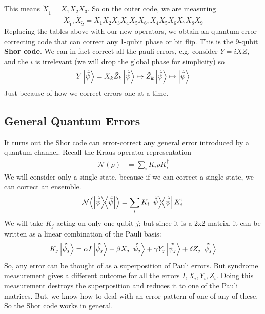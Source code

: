 This means $\tilde{X}_{\tilde{1}} = X_1 X_2 X_3$.
So on the outer code, we are measuring
\[ \tilde{X}_{\tilde{1}}, \tilde{X}_{\tilde{2}} = X_1 X_2 X_3 X_4 X_5 X_6, X_4 X_5 X_6 X_7 X_8 X_9 \]
Replacing the tables above with our new operators, we obtain an quantum error correcting code that
can correct any 1-qubit phase or bit flip. This is the $9$-qubit \textbf{Shor code}. 
We can in fact correct
all the pauli errors, e.g. consider $Y = i XZ$, and the $i$ is irrelevant (we will drop the global phase for simplicity) so \[ Y \ket{\tilde{\tilde{\psi}}} = X_k \tilde{Z}_k \ket{\tilde{\tilde{\psi}}} \mapsto \tilde{Z}_k \ket{\tilde{\tilde{\psi}}} \mapsto \ket{\tilde{\tilde{\psi}}}\]
Just because of how we correct errors one at a time.

\subsection{General Quantum Errors}
It turns out the Shor code can error-correct any general error introduced by a quantum channel.
Recall the Kraus operator representation
\begin{align*}
    \mathcal{N}(\rho) &= \sum_i K_i \rho K_i^{\dagger}
\end{align*}
We will consider only a single state, because if we can correct a single state, we can correct an ensemble.
\[ \mathcal{N}\qty(\ketbra{\tilde{\tilde{\psi}}}) = \sum_i K_i \ketbra{\tilde{\tilde{\psi}}} K_i^{\dagger} \]
We will take $K_j$ acting on only one qubit $j$; but since it is a 2x2 matrix, it can be written
as a linear combination of the Pauli basis:
\[ K_j \ket{\tilde{\tilde{\psi_j}}} = \alpha I \ket{\tilde{\tilde{\psi_j}}} + \beta X_j \ket{\tilde{\tilde{\psi_j}}} + \gamma Y_j \ket{\tilde{\tilde{\psi_j}}} + \delta Z_j \ket{\tilde{\tilde{\psi_j}}} \]
So, any error can be thought of as a superposition of Pauli errors.
But syndrome measurement gives a different outcome for all the errors $I, X_i, Y_i, Z_i$.
Doing this measurement destroys the superposition and reduces it to one of the Pauli matrices. But, we know how to deal with an error pattern of one of any of these.
So the Shor code works in general.
